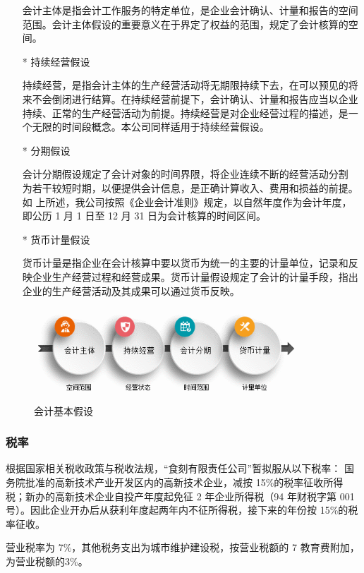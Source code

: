 \documentclass[UTF8,12pt]{ctexart}
\numberwithin{figure}{section}%
\begin{document}
\begin{spacing}{2}
\begin{itemize}
	会计主体是指会计工作服务的特定单位，是企业会计确认、计量和报告的空间范围。会计主体假设的重要意义在于界定了权益的范围，规定了会计核算的空间。
	
	\item[*] 持续经营假设
	 
	持续经营，是指会计主体的生产经营活动将无期限持续下去，在可以预见的将来不会倒闭进行结算。在持续经营前提下，会计确认、计量和报告应当以企业持续、正常的生产经营活动为前提。持续经营是对企业经营过程的描述，是一个无限的时间段概念。本公司同样适用于持续经营假设。
	
	\item[*] 分期假设
	
	会计分期假设规定了会计对象的时间界限，将企业连续不断的经营活动分割 为若干较短时期，以便提供会计信息，是正确计算收入、费用和损益的前提。如 上所述，我公司按照《企业会计准则》规定，以自然年度作为会计年度，即公历 1 月 1 日至 12 月 31 日为会计核算的时间区间。 

	\item[*] 货币计量假设 
	
	货币计量是指企业在会计核算中要以货币为统一的主要的计量单位，记录和反映企业生产经营过程和经营成果。货币计量假设规定了会计的计量手段，指出企业的生产经营活动及其成果可以通过货币反映。
	
\end{itemize}

\begin{figure}[!htb]
	\centering
	\includegraphics[width=10cm]{fig/25}
	\caption{会计基本假设}
\end{figure}


\subsubsection{税率}
根据国家相关税收政策与税收法规，“食刻有限责任公司”暂拟服从以下税率： 
国务院批准的高新技术产业开发区内的高新技术企业，减按 15\%的税率征收所得税；新办的高新技术企业自投产年度起免征 2 年企业所得税（94 年财税字第 001号）。因此企业开办后从获利年度起两年内不征所得税，接下来的年份按 
15\%的税率征收。 

营业税率为 7\%，其他税务支出为城市维护建设税，按营业税额的 7%
教育费附加，为营业税额的3\%。 


\end{spacing}
\end{document}
